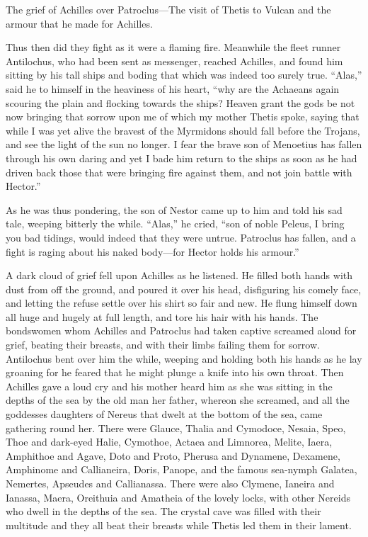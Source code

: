 
The grief of Achilles over Patroclus—The visit of Thetis to Vulcan
and the armour that he made for Achilles.

Thus then did they fight as it were a flaming fire. Meanwhile the fleet
runner Antilochus, who had been sent as messenger, reached Achilles, and
found him sitting by his tall ships and boding that which was indeed too
surely true. “Alas,” said he to himself in the heaviness of his heart,
“why are the Achaeans again scouring the plain and flocking towards the
ships? Heaven grant the gods be not now bringing that sorrow upon me of
which my mother Thetis spoke, saying that while I was yet alive the
bravest of the Myrmidons should fall before the Trojans, and see the light
of the sun no longer. I fear the brave son of Menoetius has fallen through
his own daring and yet I bade him return to the ships as soon as he had
driven back those that were bringing fire against them, and not join
battle with Hector.”

As he was thus pondering, the son of Nestor came up to him and told his
sad tale, weeping bitterly the while. “Alas,” he cried, “son of noble
Peleus, I bring you bad tidings, would indeed that they were untrue.
Patroclus has fallen, and a fight is raging about his naked body—for
Hector holds his armour.”

A dark cloud of grief fell upon Achilles as he listened. He filled both
hands with dust from off the ground, and poured it over his head,
disfiguring his comely face, and letting the refuse settle over his shirt
so fair and new. He flung himself down all huge and hugely at full length,
and tore his hair with his hands. The bondswomen whom Achilles and
Patroclus had taken captive screamed aloud for grief, beating their
breasts, and with their limbs failing them for sorrow. Antilochus bent
over him the while, weeping and holding both his hands as he lay groaning
for he feared that he might plunge a knife into his own throat. Then
Achilles gave a loud cry and his mother heard him as she was sitting in
the depths of the sea by the old man her father, whereon she screamed, and
all the goddesses daughters of Nereus that dwelt at the bottom of the sea,
came gathering round her. There were Glauce, Thalia and Cymodoce, Nesaia,
Speo, Thoe and dark-eyed Halie, Cymothoe, Actaea and Limnorea, Melite,
Iaera, Amphithoe and Agave, Doto and Proto, Pherusa and Dynamene,
Dexamene, Amphinome and Callianeira, Doris, Panope, and the famous
sea-nymph Galatea, Nemertes, Apseudes and Callianassa. There were also
Clymene, Ianeira and Ianassa, Maera, Oreithuia and Amatheia of the lovely
locks, with other Nereids who dwell in the depths of the sea. The crystal
cave was filled with their multitude and they all beat their breasts while
Thetis led them in their lament.

